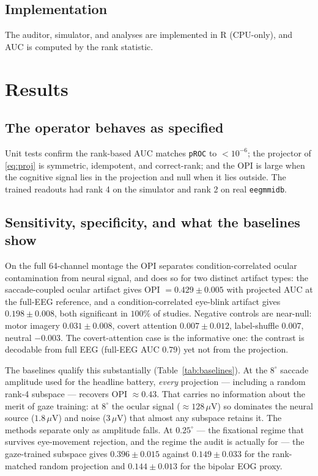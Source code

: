 \documentclass[conference]{IEEEtran}
\begin{document}
\subsection{Implementation}

The auditor, simulator, and analyses are implemented in R (CPU-only), and AUC is computed by
the rank statistic.

\section{Results}

\subsection{The operator behaves as specified}

Unit tests confirm the rank-based AUC matches \texttt{pROC} to $<10^{-6}$; the projector of
\eqref{eq:proj} is symmetric, idempotent, and correct-rank; and the OPI is large when the
cognitive signal lies in the projection and null when it lies outside. The trained readouts had
rank 4 on the simulator and rank 2 on real \texttt{eegmmidb}.

\subsection{Sensitivity, specificity, and what the baselines show}

On the full 64-channel montage the OPI separates condition-correlated ocular contamination from
neural signal, and does so for two distinct artifact types: the saccade-coupled ocular artifact gives
OPI $=0.429\pm0.005$ with projected AUC at the full-EEG reference, and a condition-correlated
eye-blink artifact gives $0.198\pm0.008$, both significant in $100\%$ of studies. Negative
controls are near-null: motor imagery $0.031\pm0.008$, covert attention $0.007\pm0.012$,
label-shuffle $0.007$, neutral $-0.003$. The covert-attention case is the informative one: the
contrast is decodable from full EEG (full-EEG AUC $0.79$) yet not from the projection.

The baselines qualify this substantially (Table~\ref{tab:baselines}). At the $8^\circ$ saccade
amplitude used for the headline battery, \emph{every} projection --- including a random rank-4
subspace --- recovers OPI $\approx 0.43$. That carries no information about the merit of
gaze training: at $8^\circ$ the ocular signal ($\approx 128\,\mu$V) so dominates the neural
source ($1.8\,\mu$V) and noise ($3\,\mu$V) that almost any subspace retains it. The methods
separate only as amplitude falls. At $0.25^\circ$ --- the fixational regime that survives
eye-movement rejection, and the regime the audit is actually for --- the gaze-trained subspace
gives $0.396\pm0.015$ against $0.149\pm0.033$ for the rank-matched random projection and
$0.144\pm0.013$ for the bipolar EOG proxy.
\end{document}
